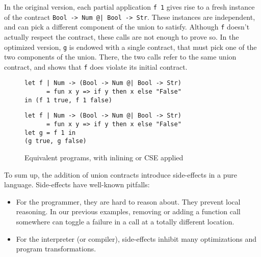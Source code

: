 \documentclass[sigplan,10pt,review,anonymous]{acmart}
\newcommand{\unsure}[2][1=]{}
\newcommand{\nickel}[1]{\lstinline[language=nickel]{#1}}
\begin{document}
In the original version, each partial application \nickel{f 1} gives rise to a
fresh instance of the contract \nickel{Bool -> Num @| Bool -> Str}. These
instances are independent, and can pick a different component of the union to
satisfy. Although \nickel{f} doesn't actually respect the contract, these calls
are not enough to prove so. In the optimized version, \nickel{g} is endowed with
a single contract, that must pick one of the two components of the union. There,
the two calls refer to the same union contract, and shows that \nickel{f} does
violate its initial contract.

\begin{figure}[h]
\begin{lstlisting}[language=nickel, title=Original]
let f | Num -> (Bool -> Num @| Bool -> Str)
      = fun x y => if y then x else "False"
in (f 1 true, f 1 false)
\end{lstlisting}
\begin{lstlisting}[language=nickel, title=Optimized]
let f | Num -> (Bool -> Num @| Bool -> Str)
      = fun x y => if y then x else "False"
let g = f 1 in
(g true, g false)
\end{lstlisting}
\caption{Equivalent programs, with inlining or CSE applied}
\label{fig:optimized-programs}
\end{figure}

\unsure{These arguments should go in the purity section}
To sum up, the addition of union contracts introduce side-effects in a pure
language. Side-effects have well-known pitfalls:
\begin{itemize}
    \item For the programmer, they are hard to reason about. They prevent local
        reasoning. In our previous examples, removing or adding a function call
        somewhere can toggle a failure in a call at a totally different
        location.
    \item For the interpreter (or compiler), side-effects inhibit many optimizations and
        program transformations.
\end{itemize}


%
\end{document}
